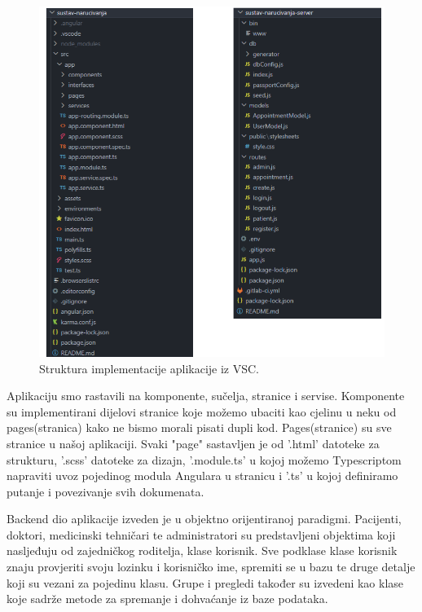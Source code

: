             \begin{figure}[H]
			            \includegraphics[width=\textwidth]{slike/struktura.png} %
			            \caption{Struktura implementacije aplikacije iz VSC.}
			            \label{fig:struktura} %
		            \end{figure}

              
               \texttt{}{ Aplikaciju smo rastavili na komponente, sučelja, stranice i servise. 
               Komponente su implementirani dijelovi stranice koje možemo ubaciti kao cjelinu u neku od pages(stranica) kako ne bismo morali pisati dupli kod. Pages(stranice) su sve stranice u našoj aplikaciji. Svaki "page" sastavljen je od '.html' datoteke za strukturu, '.scss' datoteke za dizajn, '.module.ts' u kojoj možemo Typescriptom napraviti uvoz pojedinog modula Angulara u stranicu i '.ts' u kojoj definiramo putanje i povezivanje svih dokumenata.
               
               }

                \texttt{}{ Backend dio aplikacije izveden je u objektno orijentiranoj paradigmi. Pacijenti, doktori, medicinski tehničari te administratori su predstavljeni objektima koji nasljeđuju od zajedničkog roditelja, klase korisnik. Sve podklase klase korisnik znaju provjeriti svoju lozinku i korisničko ime, spremiti se u bazu te druge detalje koji su vezani za pojedinu klasu. Grupe i pregledi također su izvedeni kao klase koje sadrže metode za spremanje i dohvaćanje iz baze podataka.
               }
        

